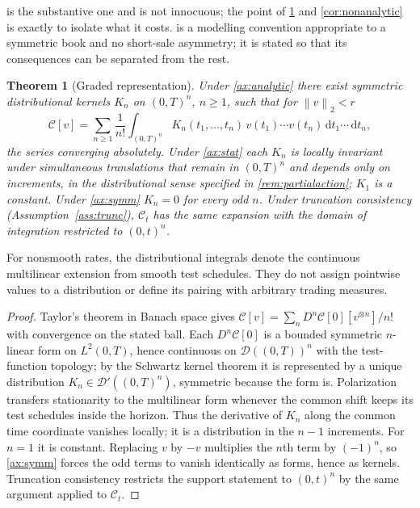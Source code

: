 \documentclass[11pt]{article}
\newcommand{\norm}[1]{\left\lVert #1\right\rVert}
\numberwithin{equation}{section}
\newtheorem{theorem}{Theorem}[section]
\theoremstyle{definition}
\theoremstyle{remark}
\theoremstyle{definition}
\newcommand{\dd}{\,\mathrm d}
\begin{document}
 is the substantive one and is not innocuous; the point of
\cref{thm:hierarchy} and \cref{cor:nonanalytic} is exactly to isolate what it
costs.  is a modelling convention appropriate to a symmetric
book and no short-sale asymmetry; it is stated so that its consequences can be
separated from the rest.

\begin{theorem}[Graded representation]\label{thm:hierarchy}
Under \cref{ax:analytic} there exist symmetric distributional kernels $K_n$ on
$(0,T)^n$, $n\geq1$, such that for $\norm v_2<r$
\begin{equation}\label{eq:volterra}
 \mathcal C[v]=\sum_{n\geq1}\frac1{n!}\int_{(0,T)^n}
 K_n(t_1,\dots,t_n)\,v(t_1)\cdots v(t_n)\dd t_1\cdots\dd t_n ,
\end{equation}
the series converging absolutely. Under \cref{ax:stat} each $K_n$ is locally
invariant under simultaneous translations that remain in $(0,T)^n$ and
depends only on increments, in the distributional sense specified in
\cref{rem:partialaction}; $K_1$ is a constant. Under \cref{ax:symm} $K_n=0$ for
every odd $n$. Under truncation consistency (Assumption~\ref{ass:trunc}),
$\mathcal C_t$ has the same expansion
with the domain of integration restricted to $(0,t)^n$.
\end{theorem}

For nonsmooth rates, the distributional integrals denote the continuous
multilinear extension from smooth test schedules. They do not assign pointwise
values to a distribution or define its pairing with arbitrary trading measures.

\begin{proof}
Taylor's theorem in Banach space gives
$\mathcal C[v]=\sum_n D^n\mathcal C[0][v^{\otimes n}]/n!$ with convergence on
the stated ball. Each $D^n\mathcal C[0]$ is a bounded symmetric $n$-linear form
on $L^2(0,T)$, hence continuous on $\mathcal D((0,T))^n$ with the test-function
topology; by the Schwartz kernel theorem it is represented by a unique
distribution $K_n\in\mathcal D'((0,T)^n)$, symmetric because the form is.
Polarization transfers stationarity to the multilinear form whenever the
common shift keeps its test schedules inside the horizon. Thus the derivative
of $K_n$ along the common time coordinate vanishes locally; it is a
distribution in the $n-1$ increments. For $n=1$ it is constant.
Replacing $v$ by $-v$ multiplies the $n$th term by $(-1)^n$, so
\cref{ax:symm} forces the odd terms to vanish identically as forms, hence as
kernels. Truncation consistency restricts the support statement to $(0,t)^n$ by the same
argument applied to $\mathcal C_t$.
\end{proof}
\end{document}
